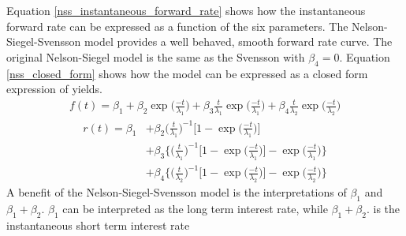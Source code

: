 \documentclass[11pt]{report}
\begin{document}
 Equation \eqref{nss_instantaneous_forward_rate} shows how the instantaneous forward rate can be expressed as a function of the six parameters. The Nelson-Siegel-Svensson model provides a well behaved, smooth forward rate curve. The original Nelson-Siegel model is the same as the Svensson with $\beta_4=0$. Equation \eqref{nss_closed_form} shows how the model can be expressed as a closed form expression of yields.
\begin{align}
	f(t)=\beta_1+\beta_2\exp\bigg(\frac{-t}{\lambda_1}\bigg)
			+\beta_3\frac{t}{\lambda_1}\exp\bigg(\frac{-t}{\lambda_1}\bigg)
			+\beta_4\frac{t}{\lambda_2}\exp\bigg(\frac{-t}{\lambda_2}\bigg)
			\label{nss_instantaneous_forward_rate}
\end{align}
\begin{align}
	r(t)=\beta_1&+\beta_2\bigg(\frac{t}{\lambda_1}\bigg)^{-1}\bigg[1-\exp\bigg(\frac{-t}{\lambda_1}\bigg)\bigg]\nonumber\\
		&+\beta_3\bigg\{\bigg(\frac{t}{\lambda_1}\bigg)^{-1}\bigg[1-\exp\bigg(\frac{-t}{\lambda_1}\bigg)\bigg]-\exp\bigg(\frac{-t}{\lambda_1}\bigg)\bigg\}\nonumber\\
		&+\beta_4\bigg\{\bigg(\frac{t}{\lambda_2}\bigg)^{-1}\bigg[1-\exp\bigg(\frac{-t}{\lambda_2}\bigg)\bigg]-\exp\bigg(\frac{-t}{\lambda_2}\bigg)\bigg\}
		\label{nss_closed_form}
\end{align}
A benefit of the Nelson-Siegel-Svensson model is the interpretations of $\beta_1$ and $\beta_1+\beta_2$. $\beta_1$ can be interpreted as the long term interest rate, while $\beta_1+\beta_2$. is the instantaneous short term interest rate
\end{document}
